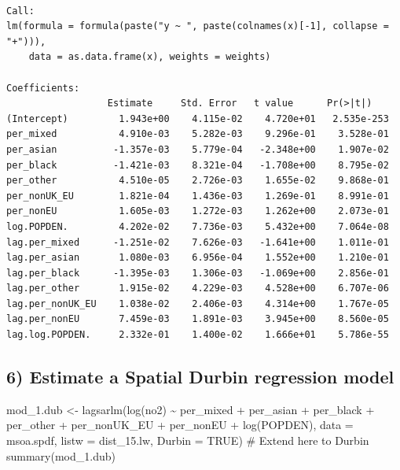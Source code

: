 \documentclass[
  letterpaper,
]{scrbook}
\newenvironment{Shaded}{\begin{snugshade}}{\end{snugshade}}
\newcommand{\AttributeTok}[1]{\textcolor[rgb]{0.40,0.45,0.13}{#1}}
\newcommand{\CommentTok}[1]{\textcolor[rgb]{0.37,0.37,0.37}{#1}}
\newcommand{\ConstantTok}[1]{\textcolor[rgb]{0.56,0.35,0.01}{#1}}
\newcommand{\FunctionTok}[1]{\textcolor[rgb]{0.28,0.35,0.67}{#1}}
\newcommand{\NormalTok}[1]{\textcolor[rgb]{0.00,0.23,0.31}{#1}}
\newcommand{\OtherTok}[1]{\textcolor[rgb]{0.00,0.23,0.31}{#1}}
\newcommand{\SpecialCharTok}[1]{\textcolor[rgb]{0.37,0.37,0.37}{#1}}
\begin{document}
\begin{verbatim}

Call:
lm(formula = formula(paste("y ~ ", paste(colnames(x)[-1], collapse = "+"))), 
    data = as.data.frame(x), weights = weights)

Coefficients:
                  Estimate     Std. Error   t value      Pr(>|t|)   
(Intercept)         1.943e+00    4.115e-02    4.720e+01   2.535e-253
per_mixed           4.910e-03    5.282e-03    9.296e-01    3.528e-01
per_asian          -1.357e-03    5.779e-04   -2.348e+00    1.907e-02
per_black          -1.421e-03    8.321e-04   -1.708e+00    8.795e-02
per_other           4.510e-05    2.726e-03    1.655e-02    9.868e-01
per_nonUK_EU        1.821e-04    1.436e-03    1.269e-01    8.991e-01
per_nonEU           1.605e-03    1.272e-03    1.262e+00    2.073e-01
log.POPDEN.         4.202e-02    7.736e-03    5.432e+00    7.064e-08
lag.per_mixed      -1.251e-02    7.626e-03   -1.641e+00    1.011e-01
lag.per_asian       1.080e-03    6.956e-04    1.552e+00    1.210e-01
lag.per_black      -1.395e-03    1.306e-03   -1.069e+00    2.856e-01
lag.per_other       1.915e-02    4.229e-03    4.528e+00    6.707e-06
lag.per_nonUK_EU    1.038e-02    2.406e-03    4.314e+00    1.767e-05
lag.per_nonEU       7.459e-03    1.891e-03    3.945e+00    8.560e-05
lag.log.POPDEN.     2.332e-01    1.400e-02    1.666e+01    5.786e-55
\end{verbatim}

\hypertarget{estimate-a-spatial-durbin-regression-model}{%
\subsection*{6) Estimate a Spatial Durbin regression
model}\label{estimate-a-spatial-durbin-regression-model}}

\begin{Shaded}
\begin{Highlighting}[]
\NormalTok{mod\_1.dub }\OtherTok{\textless{}{-}} \FunctionTok{lagsarlm}\NormalTok{(}\FunctionTok{log}\NormalTok{(no2) }\SpecialCharTok{\textasciitilde{}}\NormalTok{ per\_mixed }\SpecialCharTok{+}\NormalTok{ per\_asian }\SpecialCharTok{+}\NormalTok{ per\_black }\SpecialCharTok{+}\NormalTok{ per\_other}
                      \SpecialCharTok{+}\NormalTok{ per\_nonUK\_EU }\SpecialCharTok{+}\NormalTok{ per\_nonEU  }\SpecialCharTok{+} \FunctionTok{log}\NormalTok{(POPDEN),  }
                      \AttributeTok{data =}\NormalTok{ msoa.spdf, }
                      \AttributeTok{listw =}\NormalTok{ dist\_15.lw,}
                      \AttributeTok{Durbin =} \ConstantTok{TRUE}\NormalTok{) }\CommentTok{\# Extend here to Durbin}
\FunctionTok{summary}\NormalTok{(mod\_1.dub)}
\end{Highlighting}
\end{Shaded}
\end{document}
